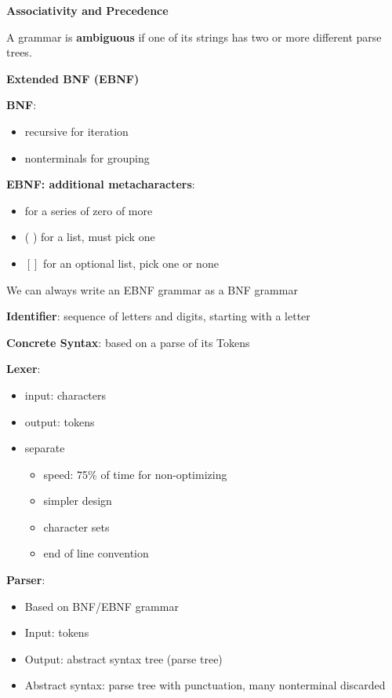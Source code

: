 \documentclass[11pt]{article} %
\begin{document}
\medskip
{\bf Associativity and Precedence}
\medskip

A grammar is {\bf ambiguous} if one of its strings has two or more different parse trees.

\medskip
{\bf Extended BNF (EBNF)}
\medskip

{\bf BNF}:
\begin{itemize}
\item recursive for iteration
\item nonterminals for grouping
\end{itemize}

{\bf EBNF: additional metacharacters}:
\begin{itemize}
\item { } for a series of zero of more
\item ( ) for a list, must pick one
\item $[ ]$ for an optional list, pick one or none
\end{itemize}

We can always write an EBNF grammar as a BNF grammar

\medskip
{\bf Identifier}: sequence of letters and digits, starting with a letter

\medskip
{\bf Concrete Syntax}:  based on a parse of its Tokens

\pagebreak
{\bf Lexer}:

\begin{itemize}
\item input: characters
\item output: tokens
\item separate
\begin{itemize}
\item speed: 75\% of time for non-optimizing
\item simpler design
\item character sets
\item end of line convention
\end{itemize}
\end{itemize}

{\bf Parser}:
\begin{itemize}
\item Based on BNF/EBNF grammar
\item Input: tokens
\item Output: abstract syntax tree (parse tree)
\item Abstract syntax: parse tree with punctuation, many nonterminal discarded
\end{itemize}
\end{document}
